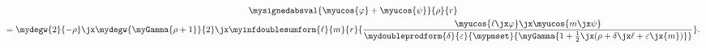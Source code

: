   \begin{multline}
      \mysignedabsval{\myucos{\varphi}+\myucos{\psi}}{\rho}{r}
\\=
\mydegw{2}{-\rho}\jx
\mydegw{\myGamma{\rho+1}}{2}\jx
\myinfdoublesumform{\ell}{m}{r}
{\frac{\myucos{\ell\jx\varphi}\jx\myucos{m\jx\psi}}
{\mydoubleprodform{\delta}{\varepsilon}{\mypmset}
{\myGamma{1+\frac{1}{2}\jx(\rho+\delta\jx\ell+\varepsilon\jx{m})}}}}
.\end{multline}
